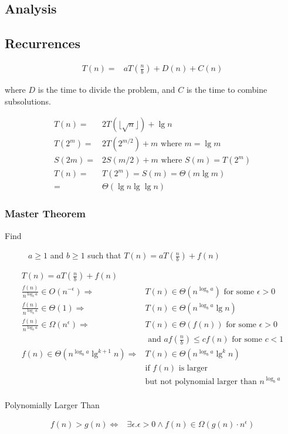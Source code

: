 \documentclass[landscape]{cheat}
\begin{document}
\begin{multicols*}{3}
\section{Analysis}
\subsection{Recurrences}
\begin{align*}
    T(n) =& aT(\frac{n}{b}) + D(n) + C(n)
\end{align*}

where $D$ is the time to divide the problem, and $C$ is the time to combine subsolutions.


\begin{align*}
    T(n) =& 2T(\lfloor \sqrt{n} \rfloor) + \lg n\\
    T(2^m) =& 2T(2^{m/2}) + m \text{ where } m = \lg m\\
    S(2m) =& 2S(m / 2) + m \text{ where } S(m) = T(2^m)\\
    T(n) =& T(2^m) = S(m) = \Theta(m \lg m)\\
        =& \Theta(\lg n \lg \lg n)
\end{align*}


\subsubsection{Master Theorem}
\begin{description}
    \item[Find] $a \geq 1$ and $b \geq 1$ such that $T(n) = a T\left(\frac n b\right) + f(n)$
\end{description}
\begin{align*}
    T(n) = a T\left(\frac n b\right) + f(n) \\
    \frac{f(n)}{n^{\log_b a}} \in O(n^{-\epsilon})  \Rightarrow& T(n) \in \Theta(n^{\log_b a}) \text { for some } \epsilon > 0  \\
    \frac{f(n)}{n^{\log_b a}} \in \Theta(1) \Rightarrow& T(n) \in \Theta(n^{\log_b a} \lg n) \\
    \frac{f(n)}{n^{\log_b a}} \in \Omega(n^{\epsilon}) \Rightarrow& T(n) \in \Theta(f(n)) \text{ for some } \epsilon > 0 \\&\text{ and } af(\frac{n}{b}) \leq cf(n) \text{ for some } c < 1 \\
f(n) \in \Theta(n^{\log_b a} \lg^{k +1} n) \Rightarrow& T(n) \in \Theta(n^{\log_b a} \lg^{k} n)\\ &\text{if } f(n) \text{ is larger}\\ &\text{but not polynomial larger than } n^{\log_b a}\\
\end{align*}
\begin{description}
    \item[Polynomially Larger Than]
\end{description}
\begin{align*}
    f(n) > g(n) \Leftrightarrow& \exists \epsilon. \epsilon > 0 \land f(n) \in \Omega(g(n) \cdot n^\epsilon)
\end{align*}


\end{multicols*}
\end{document}
